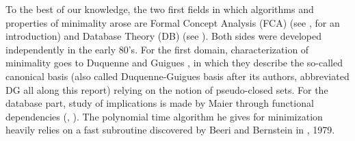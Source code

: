 \documentclass[runningheads]{llncs}
\begin{document}
To the best of our knowledge, the two first fields in which algorithms and 
properties of minimality arose are Formal Concept Analysis (FCA) (see 
\cite{ganter_formal_1999}, \cite{ganter_two_2010} for an introduction) and Database Theory (DB) (see \cite{maier_theory_1983}). Both sides were developed independently in the early 
80's. For the first domain, characterization of minimality goes to Duquenne and 
Guigues \cite{guigues_familles_1986}, in which they describe the so-called 
canonical basis (also called Duquenne-Guigues basis after its 
authors, abbreviated DG all along this report) relying on the notion of pseudo-closed sets. For the database part, study of implications is made by Maier through functional dependencies (\cite{maier_theory_1983}, \cite{maier_minimum_1980}). The polynomial time algorithm he gives for minimization heavily relies on a fast subroutine discovered by Beeri and Bernstein in \cite{beeri_computational_1979}, 1979.
\end{document}
